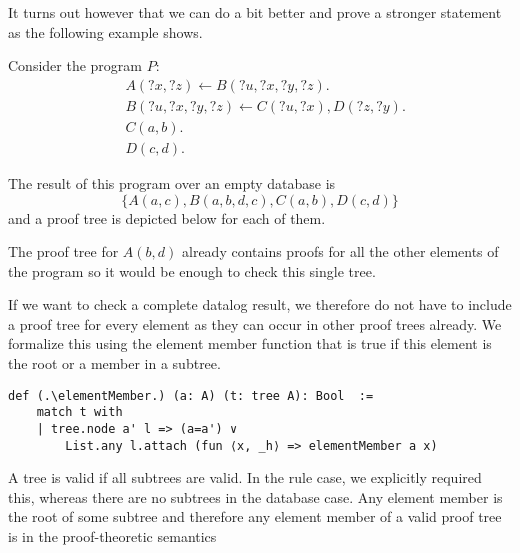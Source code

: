It turns out however that we can do a bit better and prove a stronger statement as the following example shows.
\begin{example}
    Consider the program $P:$
    \begin{align*}
        & A(?x, ?z) \leftarrow B(?u,?x, ?y, ?z). \\
        & B(?u,?x, ?y, ?z) \leftarrow C(?u,?x), D(?z, ?y). \\
        & C(a,b). \\
        & D(c,d).
        \end{align*}

    The result of this program over an empty database is \[\{A(a,c), B(a,b,d,c), C(a,b), D(c,d)\}\] and a proof tree is depicted below for each of them.



    The proof tree for $A(b,d)$ already contains proofs for all the other elements of the program so it would be enough to check this single tree.
\end{example}

If we want to check a complete datalog result, we therefore do not have to include a proof tree for every element as they can occur in other proof trees already. We formalize this using the element member function that is true if this element is the root or a member in a subtree.

\begin{lstlisting}
def (.\elementMember.) (a: A) (t: tree A): Bool  :=
    match t with
    | tree.node a' l => (a=a') ∨
        List.any l.attach (fun ⟨x, _h⟩ => elementMember a x)
\end{lstlisting}

A tree is valid if all subtrees are valid. In the rule case, we explicitly required this, whereas there are no subtrees in the database case. Any element member is the root of some subtree and therefore any element member of a valid proof tree is in the proof-theoretic semantics 

